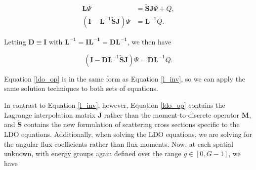\documentclass{article} %
\newcommand{\ve}[1]{\ensuremath{\mathbf{#1}}}
\begin{document}
\begin{align}
\ve{L}\Psi &= \ve{\tilde{S}J}\Psi + Q, \\
\left(\ve{I} - \ve{L^{-1} \tilde{S}J}\right)\Psi &= \ve{L^{-1}}Q.
\end{align}

\noindent Letting $\ve{D} \equiv \ve{I}$ with 
$\ve{L^{-1}} = \ve{I}\ve{L^{-1}} = \ve{D}\ve{L^{-1}}$, we then have

\begin{equation}
\left(\ve{I} - \ve{D L^{-1} \tilde{S}J}\right)\Psi = \ve{D L^{-1}}Q.
\label{ldo_op}
\end{equation}

\noindent Equation \ref{ldo_op} is in the same form as Equation \ref{l_inv},
so we can apply the same solution techniques to both sets of equations.

In contrast to Equation \ref{l_inv}, however, Equation \ref{ldo_op} contains
the Lagrange interpolation matrix $\ve{J}$ rather than the moment-to-discrete
operator $\ve{M}$, and $\ve{\tilde{S}}$ contains the new formulation of
scattering cross sections specific to the LDO equations. Additionally, when
solving the LDO equations, we are solving for the angular flux coefficients
rather than flux moments. Now, at each spatial unknown, with energy groups 
again defined over the range $g\in[0,G-1]$, we have
\end{document}
